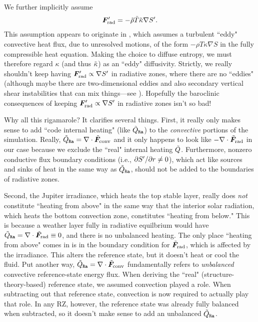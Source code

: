 \documentclass[12pt]{article}
\numberwithin{equation}{section}
\begin{document}
We further implicitly assume
\begin{align}
\bm{F}^\prime_{\rm rad}=-\tilde{\rho} \tilde{T} \tilde{\kappa} \nabla {S^\prime}.
\end{align}
This assumption appears to originate in \citet{Gilman1981}, which assumes a turbulent ``eddy" convective heat flux, due to unresolved motions, of the form $-\rho T\kappa\nabla S$ in the fully compressible heat equation. Making the choice to diffuse entropy, we must therefore regard $\kappa$ (and thus $\tilde{\kappa}$) as an ``eddy" diffusivity. Strictly, we really shouldn't keep having $\bm{F}^\prime_{\rm rad}\propto\nabla{S^\prime}$ in radiative zones, where there are no ``eddies" (although maybe there are two-dimensional eddies and also secondary vertical shear instabilities that can mix things---see \citealt{Cope2020,Garaud2020}). Hopefully the baroclinic consequences of keeping $\bm{F}^\prime_{\rm rad}\propto\nabla{S^\prime}$ in radiative zones isn't so bad!

Why all this rigamarole? It clarifies several things. First, it really only makes sense to add ``code internal heating" (like $\tilde{Q}_{\texttt{Ra}}$) to the \textit{convective} portions of the simulation. Really, $\tilde{Q}_{\texttt{Ra}}=\nabla\cdot\tilde{\bm{F}}_{\rm conv}$ and it only happens to look like $-\nabla\cdot\tilde{\bm{F}}_{\rm rad}$ in our case because we exclude the ``real" internal heating $\tilde{Q}$. Furthermore, nonzero conductive flux boundary conditions (i.e., $\partial{S^\prime}/\partial r\neq0$), which act like sources and sinks of heat in the same way as $\tilde{Q}_{\texttt{Ra}}$, should not be added to the boundaries of radiative zones. %

Second, the Jupiter irradiance, which heats the top stable layer, really does \textit{not} constitute ``heating from above" in the same way that the interior solar radiation, which heats the bottom convection zone, constitutes ``heating from below." This is because a weather layer fully in radiative equilbrium would have $\tilde{Q}_{\texttt{Ra}}=\nabla\cdot\tilde{\bm{F}}_{\rm rad}\equiv0$, and there is no unbalanced heating. The only place ``heating from above" comes in is in the boundary condition for $\tilde{\bm{F}}_{\rm rad}$, which is affected by the irradiance. This alters the reference state, but it doesn't heat or cool the fluid. Put another way, $\tilde{Q}_{\texttt{Ra}}=\nabla\cdot\tilde{\bm{F}}_{\rm conv}$ fundamentally refers to \textit{unbalanced} convective reference-state energy flux. When deriving the ``real" (structure-theory-based) reference state, we assumed convection played a role. When subtracting out that reference state, convection is now required to actually play that role. In any RZ, however, the reference state was already fully balanced when subtracted, so it doesn't make sense to add an unbalanced $\tilde{Q}_{\texttt{Ra}}$. 
\end{document}
